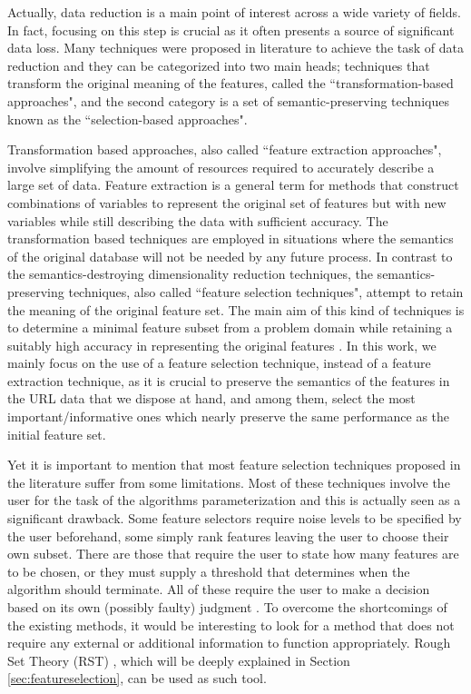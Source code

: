 \documentclass{llncs}
\begin{document}
Actually, data reduction %
is a main point of interest across a wide
variety of fields. In fact, focusing on this step is crucial as it
often presents a source of significant data loss. %
Many techniques were
proposed in literature to achieve the task of data reduction %
 and they
can be categorized into two main heads; techniques that transform the
original meaning of the features, called the ``transformation-based
approaches", and the second category is a set of semantic-preserving
techniques known as the ``selection-based approaches".

Transformation based approaches, also called ``feature extraction
approaches", involve simplifying the amount of resources required to
accurately describe a large set of data. Feature extraction is a
general term for methods that construct combinations of variables to
represent the original set of features but with new variables while
still describing the data with sufficient accuracy. The transformation
based techniques are employed in situations where the semantics of the
original database will not be needed by any future process. In
contrast to the semantics-destroying dimensionality reduction
techniques, the semantics-preserving techniques, also called ``feature
selection techniques", attempt to retain the meaning of the original
feature set. The main aim of this kind of techniques is to determine a
minimal feature subset from a problem domain while retaining a
suitably high accuracy in representing the original features
\cite{liu1998feature}. In this work, we mainly focus on the use of a
feature selection technique, instead of a feature extraction
technique, as it is crucial to preserve the semantics of the features
in the URL data that we dispose at hand, and among them, select the
most important/informative ones which nearly preserve  the same
performance as the initial feature set.

Yet it is important to mention that most feature selection techniques
proposed in the literature suffer from some limitations. Most of these
techniques involve the user for the task of the algorithms
parameterization and this is actually seen as a significant
drawback. Some feature selectors require noise levels to be specified
by the user beforehand, some simply rank features leaving the user to
choose their own subset. There are those that require the user to
state how many features are to be chosen, or they must supply a
threshold that determines when the algorithm should terminate. All of
these require the user to make a decision based on its own (possibly
faulty) judgment \cite{jensen2005semantics}. To overcome the
shortcomings of the existing methods, it would be interesting to look
for a method that does not require any external or additional
information to function appropriately. Rough Set Theory (RST)
\cite{pawlak2008rough}, which will be deeply explained in Section
\ref{sec:featureselection}, can be used as such tool.
\end{document}
